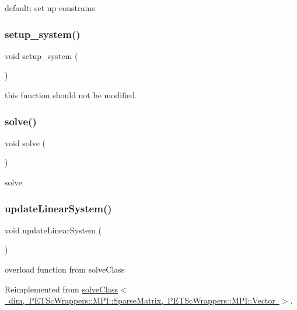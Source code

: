 default\+: set up constrains \mbox{\label{classinit_bound_val_probs_a8f0c6272cf214048329d7cf1aa58b860}} 
\subsubsection{\texorpdfstring{setup\_system()}{setup\_system()}}
{\footnotesize\ttfamily void setup\+\_\+system (\begin{DoxyParamCaption}{ }\end{DoxyParamCaption})}

this function should not be modified. \mbox{\label{classinit_bound_val_probs_af7d39f0eac0af0ed5785935ac72a1e7d}} 
\subsubsection{\texorpdfstring{solve()}{solve()}}
{\footnotesize\ttfamily void solve (\begin{DoxyParamCaption}{ }\end{DoxyParamCaption})\hspace{0.3cm}{\ttfamily [virtual]}}

solve \mbox{\label{classinit_bound_val_probs_af78c2c6284234c93872188334fb997d8}} 
\subsubsection{\texorpdfstring{updateLinearSystem()}{updateLinearSystem()}}
{\footnotesize\ttfamily void update\+Linear\+System (\begin{DoxyParamCaption}{ }\end{DoxyParamCaption})\hspace{0.3cm}{\ttfamily [virtual]}}

overload function from solve\+Class 

Reimplemented from \mbox{\hyperlink{classsolve_class_af78c2c6284234c93872188334fb997d8}{solve\+Class$<$ dim, P\+E\+T\+Sc\+Wrappers\+::\+M\+P\+I\+::\+Sparse\+Matrix, P\+E\+T\+Sc\+Wrappers\+::\+M\+P\+I\+::\+Vector $>$}}.



